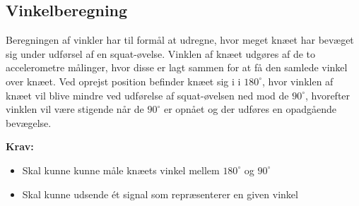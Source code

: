 \subsection{Vinkelberegning}
Beregningen af vinkler har til formål at udregne, hvor meget knæet har bevæget sig under udførsel af en squat-øvelse. Vinklen af knæet udgøres af de to accelerometre målinger, hvor disse er lagt sammen for at få den samlede vinkel over knæet.
Ved oprejst position befinder knæet sig i i $180^{\circ}$, hvor vinklen af knæet vil blive mindre ved udførelse af squat-øvelsen ned mod de $90^{\circ}$, hvorefter vinklen vil være stigende når de $90^{\circ}$ er opnået og der udføres en opadgående bevægelse. 

\vspace{3mm}
\textbf{Krav:}
\begin{itemize}
\item Skal kunne kunne måle knæets vinkel mellem $180^{\circ}$ og $90^{\circ}$
\item Skal kunne udsende ét signal som repræsenterer en given vinkel
\end{itemize}